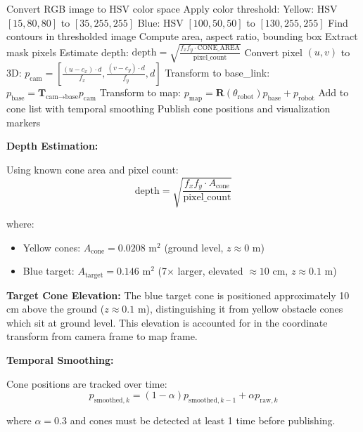 \documentclass[11pt]{article}
\begin{document}
\begin{algorithm}[H]
\caption{Camera Cone Detection}
\begin{algorithmic}[1]
\State Convert RGB image to HSV color space
\State Apply color threshold:
    \State Yellow: HSV $[15, 80, 80]$ to $[35, 255, 255]$
    \State Blue: HSV $[100, 50, 50]$ to $[130, 255, 255]$
\State Find contours in thresholded image
    \State Compute area, aspect ratio, bounding box
        \State Extract mask pixels
        \State Estimate depth: $\text{depth} = \sqrt{\frac{f_x f_y \cdot \text{CONE\_AREA}}{\text{pixel\_count}}}$
        \State Convert pixel $(u, v)$ to 3D: $p_{\text{cam}} = [\frac{(u-c_x) \cdot d}{f_x}, \frac{(v-c_y) \cdot d}{f_y}, d]$
        \State Transform to base\_link: $p_{\text{base}} = \mathbf{T}_{\text{cam}\rightarrow\text{base}} p_{\text{cam}}$
        \State Transform to map: $p_{\text{map}} = \mathbf{R}(\theta_{\text{robot}}) p_{\text{base}} + p_{\text{robot}}$
        \State Add to cone list with temporal smoothing
    \EndIf
\EndFor
\State Publish cone positions and visualization markers
\end{algorithmic}
\end{algorithm}

\textbf{Depth Estimation:}

Using known cone area and pixel count:
\[
\text{depth} = \sqrt{\frac{f_x f_y \cdot A_{\text{cone}}}{\text{pixel\_count}}}
\]

where:
\begin{itemize}
    \item Yellow cones: $A_{\text{cone}} = 0.0208$ m$^2$ (ground level, $z \approx 0$ m)
    \item Blue target: $A_{\text{target}} = 0.146$ m$^2$ (7$\times$ larger, elevated $\approx 10$ cm, $z \approx 0.1$ m)
\end{itemize}

\textbf{Target Cone Elevation:} The blue target cone is positioned approximately 10 cm above the ground ($z \approx 0.1$ m), distinguishing it from yellow obstacle cones which sit at ground level. This elevation is accounted for in the coordinate transform from camera frame to map frame.

\textbf{Temporal Smoothing:}

Cone positions are tracked over time:
\[
p_{\text{smoothed},k} = (1-\alpha) p_{\text{smoothed},k-1} + \alpha p_{\text{raw},k}
\]

where $\alpha = 0.3$ and cones must be detected at least 1 time before publishing.
\end{document}
